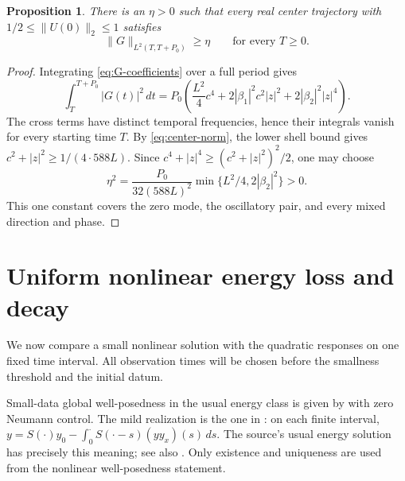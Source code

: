 \documentclass[11pt]{article}
\newtheorem{proposition}[theorem]{Proposition}
\theoremstyle{remark}\newtheorem{remark}[theorem]{Remark}
\numberwithin{equation}{section}
\begin{document}
\begin{proposition}\label{prop:coercivity}
There is an $\eta>0$ such that every real center trajectory with
$1/2\le\|U(0)\|_2\le1$ satisfies
\begin{equation}\label{eq:coercivity}
 \|G\|_{L^2(T,T+P_0)}\ge\eta\qquad\text{for every }T\ge0.
\end{equation}
\end{proposition}
\begin{proof}
Integrating \eqref{eq:G-coefficients} over a full period gives
\[
 \int_T^{T+P_0}|G(t)|^2\,dt
 =P_0\left(\frac{L^2}{4}c^4+2|\beta_1|^2c^2|z|^2
                 +2|\beta_2|^2|z|^4\right).
\]
The cross terms have distinct temporal frequencies, hence their integrals
vanish for every starting time $T$. By \eqref{eq:center-norm}, the lower
shell bound gives $c^2+|z|^2\ge1/(4\cdot588L)$. Since
$c^4+|z|^4\ge(c^2+|z|^2)^2/2$, one may choose
\[
 \eta^2=\frac{P_0}{32(588L)^2}\min\{L^2/4,2|\beta_2|^2\}>0.
\]
This one constant covers the zero mode, the oscillatory pair, and every
mixed direction and phase.
\end{proof}

\section{Uniform nonlinear energy loss and decay}\label{sec:nonlinear}
We now compare a small nonlinear solution with the quadratic responses on
one fixed time interval. All observation times will be chosen before the
smallness threshold and the initial datum.

Small-data global well-posedness in the usual energy class is given by
\cite[Lemma 3.2]{NX25} with zero Neumann control. The mild realization is the
one in \cite[Proposition 7 and Appendix A]{CC}: on each finite interval,
$y=S(\cdot)y_0-\int_0^{\cdot}S(\cdot-s)(yy_x)(s)\,ds$.
The source's usual energy solution has precisely this meaning; see also
\cite[Lemma 5.4]{CKN}. Only existence and uniqueness are used from the
nonlinear well-posedness statement.
\end{document}
